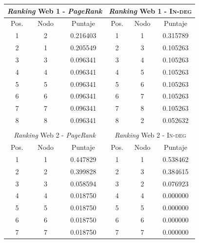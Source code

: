             \begin{center}
                \begin{tabular}{|c|c|c||c|c|c|}
                    \hline
                    \multicolumn{3}{|c||}{\emph{Ranking} Web 1 - \emph{PageRank}} & \multicolumn{3}{c|}{\emph{Ranking} Web 1 - \textsc{In-deg}} \\ \hline
                    Pos. & Nodo & Puntaje    & Pos. & Nodo & Puntaje  \\ \hline
                    1    & 2    & 0.216403   & 1    & 1    & 0.315789 \\
                    2    & 1    & 0.205549   & 2    & 3    & 0.105263 \\
                    3    & 3    & 0.096341   & 3    & 4    & 0.105263 \\
                    4    & 4    & 0.096341   & 4    & 5    & 0.105263 \\
                    5    & 5    & 0.096341   & 5    & 6    & 0.105263 \\
                    6    & 6    & 0.096341   & 6    & 7    & 0.105263 \\
                    7    & 7    & 0.096341   & 7    & 8    & 0.105263 \\
                    8    & 8    & 0.096341   & 8    & 2    & 0.052632 \\ \hline
                    \multicolumn{6}{c}{} \\ \hline
                    \multicolumn{3}{|c||}{\emph{Ranking} Web 2 - \emph{PageRank}} & \multicolumn{3}{c|}{\emph{Ranking} Web 2 - \textsc{In-deg}} \\ \hline
                    Pos. & Nodo & Puntaje    & Pos. & Nodo & Puntaje  \\ \hline
                    1    & 1    & 0.447829   & 1    & 1    & 0.538462 \\
                    2    & 2    & 0.399828   & 2    & 3    & 0.384615 \\
                    3    & 3    & 0.058594   & 3    & 2    & 0.076923 \\
                    4    & 4    & 0.018750   & 4    & 4    & 0.000000 \\
                    5    & 5    & 0.018750   & 5    & 5    & 0.000000 \\
                    6    & 6    & 0.018750   & 6    & 6    & 0.000000 \\
                    7    & 7    & 0.018750   & 7    & 7    & 0.000000 \\

\end{tabular}
\end{center}
